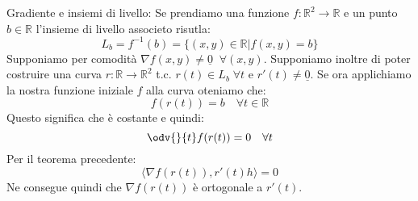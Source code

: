 Gradiente e insiemi di livello: Se prendiamo una funzione $f: \mathbb{R}^2 \to 
\mathbb{R}$ e un punto $b \in \mathbb{R}$ l'insieme di livello associeto 
risutla:
\begin{equation*}
	L_b = f^{-1}(b) = \{(x, y) \in \mathbb{R} | f(x, y) = b\}
\end{equation*}
Supponiamo per comodità $\nabla f(x, y) \neq \underline{0} \;\; \forall (x, y)$. 
Supponiamo inoltre di poter costruire una curva $r: \mathbb{R} \to 
\mathbb{R}^2$ t.c. $r(t) \in L_b \; \forall t$ e $r'(t) \neq \underline{0}$. 
Se ora applichiamo la nostra funzione iniziale $f$ alla curva oteniamo che:
\begin{equation*}
	f(r(t)) = b \quad \forall t \in \mathbb{R}
\end{equation*}
Questo significa che è costante e quindi:
\begin{equation*}
	\odv{}{t} f(r(t)) = 0 \quad \forall t
\end{equation*}
Per il teorema precedente:
\begin{equation*}
	\langle \nabla f(r(t)), r'(t)h \rangle = 0
\end{equation*}
Ne consegue quindi che $\nabla f(r(t))$ è ortogonale a $r'(t)$.

